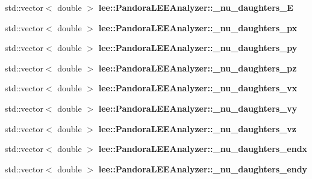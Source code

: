 \begin{DoxyCompactItemize}
\item 
\hypertarget{group__lee_gac1d71f8ed82068b3a02d9a37905bf195}{std\-::vector$<$ double $>$ {\bfseries lee\-::\-Pandora\-L\-E\-E\-Analyzer\-::\-\_\-nu\-\_\-daughters\-\_\-\-E}}\label{group__lee_gac1d71f8ed82068b3a02d9a37905bf195}

\item 
\hypertarget{group__lee_gaa834071311edb5ffa50db6132496fb95}{std\-::vector$<$ double $>$ {\bfseries lee\-::\-Pandora\-L\-E\-E\-Analyzer\-::\-\_\-nu\-\_\-daughters\-\_\-px}}\label{group__lee_gaa834071311edb5ffa50db6132496fb95}

\item 
\hypertarget{group__lee_ga3e2b79305694205bc16527e7d086058a}{std\-::vector$<$ double $>$ {\bfseries lee\-::\-Pandora\-L\-E\-E\-Analyzer\-::\-\_\-nu\-\_\-daughters\-\_\-py}}\label{group__lee_ga3e2b79305694205bc16527e7d086058a}

\item 
\hypertarget{group__lee_ga838abd41f7c806c0242d1d612e1a3c80}{std\-::vector$<$ double $>$ {\bfseries lee\-::\-Pandora\-L\-E\-E\-Analyzer\-::\-\_\-nu\-\_\-daughters\-\_\-pz}}\label{group__lee_ga838abd41f7c806c0242d1d612e1a3c80}

\item 
\hypertarget{group__lee_ga35e3d0f602ee460d83440447698baef1}{std\-::vector$<$ double $>$ {\bfseries lee\-::\-Pandora\-L\-E\-E\-Analyzer\-::\-\_\-nu\-\_\-daughters\-\_\-vx}}\label{group__lee_ga35e3d0f602ee460d83440447698baef1}

\item 
\hypertarget{group__lee_gaa564f473e072ce7fc9702781805907bd}{std\-::vector$<$ double $>$ {\bfseries lee\-::\-Pandora\-L\-E\-E\-Analyzer\-::\-\_\-nu\-\_\-daughters\-\_\-vy}}\label{group__lee_gaa564f473e072ce7fc9702781805907bd}

\item 
\hypertarget{group__lee_gadda9ce5e644a8f78ef769f443990ab20}{std\-::vector$<$ double $>$ {\bfseries lee\-::\-Pandora\-L\-E\-E\-Analyzer\-::\-\_\-nu\-\_\-daughters\-\_\-vz}}\label{group__lee_gadda9ce5e644a8f78ef769f443990ab20}

\item 
\hypertarget{group__lee_ga2c05930087430260a4ba4f26beb8355b}{std\-::vector$<$ double $>$ {\bfseries lee\-::\-Pandora\-L\-E\-E\-Analyzer\-::\-\_\-nu\-\_\-daughters\-\_\-endx}}\label{group__lee_ga2c05930087430260a4ba4f26beb8355b}

\item 
\hypertarget{group__lee_gafdefa43fde43f949f6b6af3e908cb1e2}{std\-::vector$<$ double $>$ {\bfseries lee\-::\-Pandora\-L\-E\-E\-Analyzer\-::\-\_\-nu\-\_\-daughters\-\_\-endy}}\label{group__lee_gafdefa43fde43f949f6b6af3e908cb1e2}


\end{DoxyCompactItemize}
